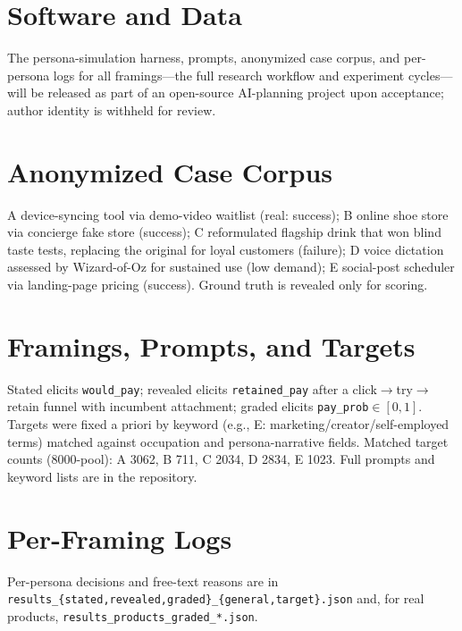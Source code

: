 \documentclass{article}
\begin{document}
\section*{Software and Data}
The persona-simulation harness, prompts, anonymized case corpus, and per-persona
logs for all framings---the full research workflow and experiment cycles---will be
released as part of an open-source AI-planning project upon acceptance; author
identity is withheld for review.




\newpage\appendix\onecolumn
\section{Anonymized Case Corpus}
A device-syncing tool via demo-video waitlist (real: success); B online shoe store
via concierge fake store (success); C reformulated flagship drink that won blind
taste tests, replacing the original for loyal customers (failure); D voice
dictation assessed by Wizard-of-Oz for sustained use (low demand); E social-post
scheduler via landing-page pricing (success). Ground truth is revealed only for
scoring.
\section{Framings, Prompts, and Targets}
Stated elicits \texttt{would\_pay}; revealed elicits \texttt{retained\_pay} after a
click$\rightarrow$try$\rightarrow$retain funnel with incumbent attachment; graded
elicits \texttt{pay\_prob}$\in[0,1]$. Targets were fixed a priori by keyword (e.g.,
E: marketing/creator/self-employed terms) matched against occupation and
persona-narrative fields. Matched target counts (8000-pool): A 3062, B 711, C 2034,
D 2834, E 1023. Full prompts and keyword lists are in the repository.
\section{Per-Framing Logs}
Per-persona decisions and free-text reasons are in
\texttt{results\_\{stated,revealed,graded\}\_\{general,target\}.json} and, for real
products, \texttt{results\_products\_graded\_*.json}.
\end{document}
